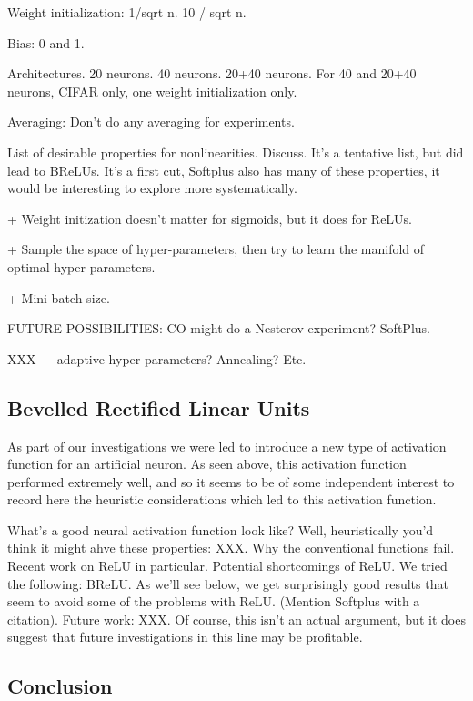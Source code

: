 \documentclass[10pt]{article}
\begin{document}
Weight initialization: 1/sqrt n.  10 / sqrt n.

Bias: 0 and 1.

Architectures.  20 neurons. 40 neurons.  20+40 neurons.  For 40 and
20+40 neurons, CIFAR only, one weight initialization only.

Averaging: Don't do any averaging for experiments.

List of desirable properties for nonlinearities.  Discuss.  It's a
tentative list, but did lead to BReLUs.  It's a first cut, Softplus
also has many of these properties, it would be interesting to explore
more systematically.


+ Weight initization doesn't matter for sigmoids, but it does for ReLUs.

+ Sample the space of hyper-parameters, then try to learn the manifold
of optimal hyper-parameters.

+ Mini-batch size.

FUTURE POSSIBILITIES: CO might do a Nesterov experiment?  SoftPlus.

XXX --- adaptive hyper-parameters?  Annealing?  Etc.

\subsection*{Bevelled Rectified Linear Units}

As part of our investigations we were led to introduce a new type of
activation function for an artificial neuron.  As seen above, this
activation function performed extremely well, and so it seems to be of
some independent interest to record here the heuristic considerations
which led to this activation function.

What's a good neural activation function look like?  Well,
heuristically you'd think it might ahve these properties: XXX.  Why
the conventional functions fail.  Recent work on ReLU in particular.
Potential shortcomings of ReLU.  We tried the following: BReLU.  As
we'll see below, we get surprisingly good results that seem to avoid
some of the problems with ReLU. (Mention Softplus with a citation).
Future work: XXX.  Of course, this isn't an actual argument, but it
does suggest that future investigations in this line may be
profitable.

\subsection*{Conclusion}
\end{document}
